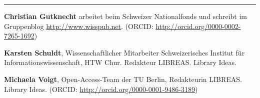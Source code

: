 \begin{center}\rule{0.5\linewidth}{\linethickness}\end{center}

\textbf{Christian Gutknecht} arbeitet beim Schweizer Nationalfonds und
schreibt im Gruppenblog \url{http://www.wisspub.net}. (ORCID:
\url{http://orcid.org/0000-0002-7265-1692})

\textbf{Karsten Schuldt}, Wissenschaftlicher Mitarbeiter Schweizerisches
Institut für Informationswissenschaft, HTW Chur. Redakteur LIBREAS.
Library Ideas.

\textbf{Michaela Voigt}, Open-Access-Team der TU Berlin, Redakteurin
LIBREAS. Library Ideas. (ORCID:
\url{http://orcid.org/0000-0001-9486-3189})
